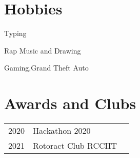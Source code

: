 \documentclass[]{deedy-resume-openfont}
\begin{document}
\begin{minipage}[t]{0.5\textwidth}
\section{Hobbies}
\vspace{\topsep} %
\begin{tightemize}
\item Typing
\item Rap Music and Drawing
\item Gaming,Grand Theft Auto
\end{tightemize}
\sectionsep
\section{Awards and Clubs} 
\begin{tabular}{rll}
2020& Hackathon 2020\\
2021 &Rotoract Club RCCIIT\\
\end{tabular}
\sectionsep

\end{minipage} 
\end{document}
